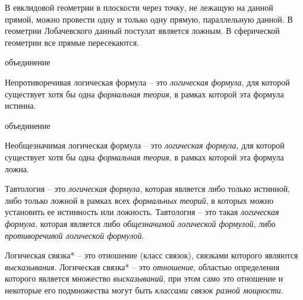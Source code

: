 В евклидовой геометрии в плоскости через точку, не лежащую на данной прямой, можно провести одну и только одну прямую, параллельную данной. В геометрии Лобачевского данный постулат является ложным.
В сферической геометрии все прямые пересекаются.

\begin{SCn}
\begin{scnreltoset}{объединение}
\end{scnreltoset}
\end{SCn}

Непротиворечивая логическая формула -- это \textit{логическая формула}, для которой существует хотя бы одна \textit{формальная теория}, в рамках которой эта формула истинна.

\begin{SCn}
\begin{scnreltoset}{объединение}
\end{scnreltoset}
\end{SCn}

Необщезначимая логическая формула -- это \textit{логическая формула}, для которой существует хотя бы одна \textit{формальная теория}, в рамках которой эта формула ложна.

Тавтология -- это \textit{логическая формула}, которая является либо только истинной, либо только ложной в рамках всех \textit{формальных теорий}, в которых можно установить ее истинность или ложность.
Тавтология -- это такая \textit{логическая формула}, которая является либо \textit{общезначимой логической формулой}, либо \textit{противоречивой логической формулой}.

\begin{SCn}
\end{SCn}

Логическая связка* -- это отношение (класс связок), связками которого являются \textit{высказывания}.
Логическая связка* -- это \textit{отношение}, областью определения которого является множество \textit{высказываний}, при этом само это отношение и некоторые его подмножества могут быть \textit{классами связок разной мощности}.

